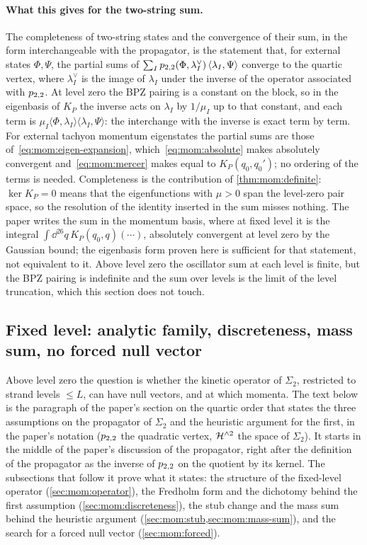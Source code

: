 \paragraph{What this gives for the two-string sum.}
The completeness of two-string states and the convergence of their sum, in the form interchangeable with the propagator, is the statement that, for external states $\Phi, \Psi$, the partial sums of $\sum_I p_{2,2}(\Phi, \lambda_I^\vee) \, \langle \lambda_I, \Psi \rangle$ converge to the quartic vertex, where $\lambda_I^\vee$ is the image of $\lambda_I$ under the inverse of the operator associated with $p_{2,2}$.
At level zero the BPZ pairing is a constant on the block, so in the eigenbasis of $K_P$ the inverse acts on $\lambda_I$ by $1 / \mu_I$ up to that constant, and each term is $\mu_I \langle \Phi, \lambda_I \rangle \langle \lambda_I, \Psi \rangle$: the interchange with the inverse is exact term by term.
For external tachyon momentum eigenstates the partial sums are those of~\eqref{eq:mom:eigen-expansion}, which~\eqref{eq:mom:absolute} makes absolutely convergent and~\eqref{eq:mom:mercer} makes equal to $K_P(q_0, q_0')$; no ordering of the terms is needed.
Completeness is the contribution of \cref{thm:mom:definite}: $\ker K_P = 0$ means that the eigenfunctions with $\mu > 0$ span the level-zero pair space, so the resolution of the identity inserted in the sum misses nothing.
The paper writes the sum in the momentum basis, where at fixed level it is the integral $\int \dd^{26} q \, K_P(q_0, q) (\cdots)$, absolutely convergent at level zero by the Gaussian bound; the eigenbasis form proven here is sufficient for that statement, not equivalent to it.
Above level zero the oscillator sum at each level is finite, but the BPZ pairing is indefinite and the sum over levels is the limit of the level truncation, which this section does not touch.

\subsection{Fixed level: analytic family, discreteness, mass sum, no forced null vector}
\label{sec:mom:fixed-level}

Above level zero the question is whether the kinetic operator of $\Sigma_2$, restricted to strand levels $\le L$, can have null vectors, and at which momenta.
The text below is the paragraph of the paper's section on the quartic order that states the three assumptions on the propagator of $\Sigma_2$ and the heuristic argument for the first, in the paper's notation ($p_{2,2}$ the quadratic vertex, $\mathcal{H}^{\wedge 2}$ the space of $\Sigma_2$).
It starts in the middle of the paper's discussion of the propagator, right after the definition of the propagator as the inverse of $p_{2,2}$ on the quotient by its kernel.
The subsections that follow it prove what it states: the structure of the fixed-level operator (\cref{sec:mom:operator}), the Fredholm form and the dichotomy behind the first assumption (\cref{sec:mom:discreteness}), the stub change and the mass sum behind the heuristic argument (\cref{sec:mom:stub,sec:mom:mass-sum}), and the search for a forced null vector (\cref{sec:mom:forced}).

